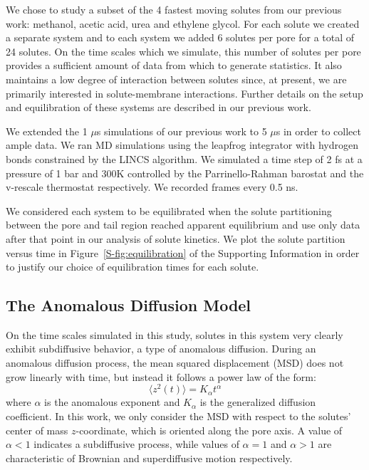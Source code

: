 \documentclass[journal=jctcce,manuscript=article]{achemso}
\begin{document}
  We chose to study a subset of the 4 fastest moving solutes from our previous
  work: methanol, acetic acid, urea and ethylene glycol. For each solute we 
  created a separate system and to each system we added 6 solutes per pore 
  for a total of 24 solutes. On the time scales which we simulate, this number
  of solutes per pore provides a sufficient amount of data from which to 
  generate statistics. It also maintains a low degree of interaction between
  solutes since, at present, we are primarily interested in solute-membrane 
  interactions. Further details on the setup and equilibration of these systems
  are described in our previous work.\cite{coscia_chemically_2019}
  
  We extended the 1 $\mu$s simulations of our previous work to 5 $\mu$s in order
  to collect ample data. We ran MD simulations using the leapfrog integrator with 
  hydrogen bonds constrained by the LINCS algorithm. We simulated a time step of 2 fs at
  a pressure of 1 bar and 300K controlled by the Parrinello-Rahman barostat and
  the v-rescale thermostat respectively. We recorded frames every 0.5 ns.
  
  We considered each system to be equilibrated when the solute partitioning between the 
  pore and tail region reached apparent equilibrium and use only data after that point
  in our analysis of solute kinetics. We plot the solute partition versus time in
  Figure~\ref{S-fig:equilibration} of the Supporting Information in order to justify
  our choice of equilibration times for each solute.

  \subsection{The Anomalous Diffusion Model}\label{method:model_sFBM}

  On the time scales simulated in this study,
  solutes in this system very clearly exhibit subdiffusive behavior, a type of
  anomalous diffusion. During an anomalous diffusion process, the mean squared 
  displacement (MSD) does not grow linearly with time, but instead it follows 
  a power law of the form: 
  \begin{equation} 
  \langle z^2(t) \rangle = K_{\alpha}t^{\alpha}
  \label{eqn:msd_form}
  \end{equation} 
  where $\alpha$ is the anomalous exponent and $K_{\alpha}$ is the generalized 
  diffusion coefficient. In this work, we only consider the MSD with respect to
  the solutes' center of mass $z$-coordinate, which is oriented along the pore 
  axis. A value of $\alpha < 1$ indicates a subdiffusive process, while values
  of $\alpha = 1$ and $\alpha > 1$ are characteristic of Brownian and 
  superdiffusive motion respectively.
 
\end{document}
